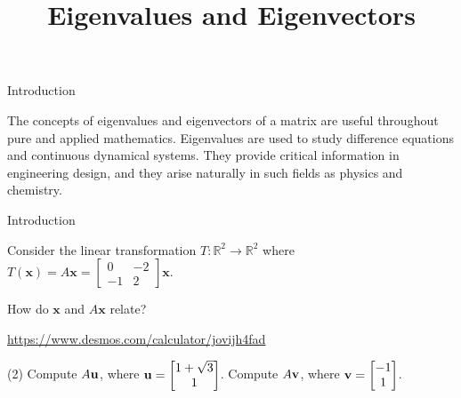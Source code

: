 \documentclass[xcolor=dvipsnames,aspectratio=169,t]{beamer}
\title{Eigenvalues and Eigenvectors}
\begin{document}
\maketitle

\begin{frame}{Introduction}
  \bigskip

  The concepts of \alert{eigenvalues} and \alert{eigenvectors} of a matrix are useful throughout pure and applied mathematics.
  \bi
  \ii Eigenvalues are used to study difference equations and continuous dynamical systems. 
  \ii They provide critical information in engineering design, and they arise naturally in such fields as physics and chemistry.
  \ei
\end{frame}

\begin{frame}{Introduction}
  \bigskip
  
  
  Consider the linear transformation $T\colon\mathbb{R}^2\to\mathbb{R}^2$ where 
  $T(\mathbf{x})=A\mathbf{x}=\begin{bmatrix} 0 & -2 \\ -1 & 2 \end{bmatrix}\mathbf{x}$.
  \medskip
  
  How do $\mathbf{x}$ and $A\mathbf{x}$ relate?
  \bigskip
  
  \url{https://www.desmos.com/calculator/jovijh4fad}
  \vspace*{2em}

  \pause
  \begin{tasks}(2)
  \task Compute $A\mathbf{u}$, where $\mathbf{u} = \begin{bmatrix} 1+\sqrt{3} \\ 1 \end{bmatrix}$.
  \task Compute $A\mathbf{v}$, where $\mathbf{v} = \begin{bmatrix} -1 \\ 1 \end{bmatrix}$.
  \end{tasks}

  \begin{columns}[T]
  \column{0.6\tw}


\end{columns}
\end{frame}
\end{document}
